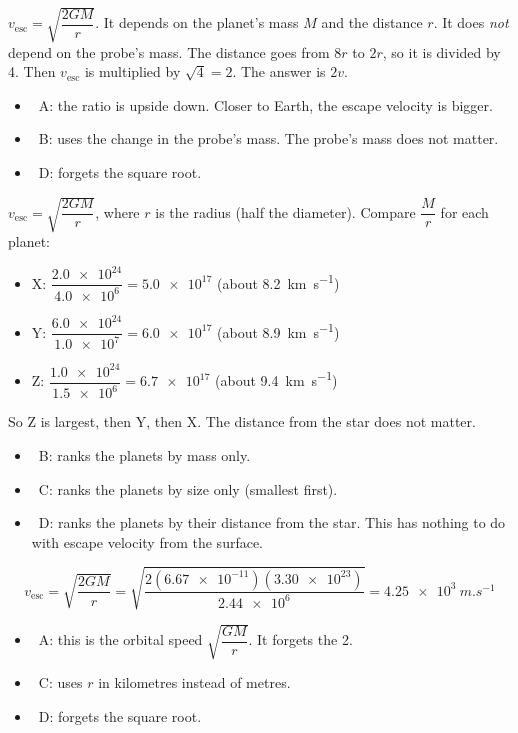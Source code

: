 \documentclass[12pt]{article}
\begin{document}
\begin{practiceanswers}
\begin{practiceans}
  $v_\mathrm{esc} = \sqrt{\dfrac{2GM}{r}}$. It depends on the planet's mass $M$ and the distance
  $r$. It does \emph{not} depend on the probe's mass. The distance goes from $8r$ to $2r$, so it
  is divided by 4. Then $v_\mathrm{esc}$ is multiplied by $\sqrt{4} = 2$. The answer is $2v$.
  \begin{itemize}
    \item \xmark\ A: the ratio is upside down. Closer to Earth, the escape velocity is bigger.
    \item \xmark\ B: uses the change in the probe's mass. The probe's mass does not matter.
    \item \xmark\ D: forgets the square root.
  \end{itemize}
\end{practiceans}

\begin{practiceans}
  $v_\mathrm{esc} = \sqrt{\dfrac{2GM}{r}}$, where $r$ is the radius (half the diameter). Compare
  $\dfrac{M}{r}$ for each planet:
  \begin{itemize}
    \item X: $\dfrac{\num{2.0e24}}{\num{4.0e6}} = \num{5.0e17}$
          \quad(about \qty{8.2}{km.s^{-1}})
    \item Y: $\dfrac{\num{6.0e24}}{\num{1.0e7}} = \num{6.0e17}$
          \quad(about \qty{8.9}{km.s^{-1}})
    \item Z: $\dfrac{\num{1.0e24}}{\num{1.5e6}} = \num{6.7e17}$
          \quad(about \qty{9.4}{km.s^{-1}})
  \end{itemize}
  So Z is largest, then Y, then X. The distance from the star does not matter.
  \begin{itemize}
    \item \xmark\ B: ranks the planets by mass only.
    \item \xmark\ C: ranks the planets by size only (smallest first).
    \item \xmark\ D: ranks the planets by their distance from the star. This has nothing to do with
          escape velocity from the surface.
  \end{itemize}
\end{practiceans}

\begin{practiceans}
  \[ v_\mathrm{esc} = \sqrt{\frac{2GM}{r}}
       = \sqrt{\frac{2(\num{6.67e-11})(\num{3.30e23})}{\num{2.44e6}}}
       = \qty{4.25e3}{m.s^{-1}} \]
  \begin{itemize}
    \item \xmark\ A: this is the orbital speed $\sqrt{\dfrac{GM}{r}}$. It forgets the 2.
    \item \xmark\ C: uses $r$ in kilometres instead of metres.
    \item \xmark\ D: forgets the square root.
  \end{itemize}
\end{practiceans}


\end{practiceanswers}
\end{document}
